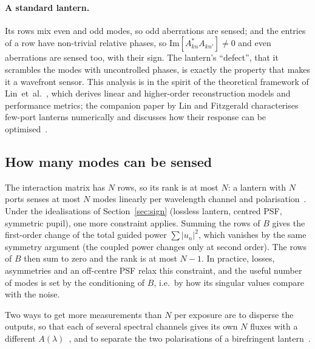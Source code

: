 \documentclass[11pt,a4paper]{article}
\begin{document}
\paragraph{A standard lantern.} Its rows mix even and odd modes, so odd aberrations are sensed; and the entries of a row have non-trivial relative phases, so $\mathrm{Im}[A_{kn}^* A_{kn'}] \neq 0$ and even aberrations are sensed too, with their sign. The lantern's ``defect'', that it scrambles the modes with uncontrolled phases, is exactly the property that makes it a wavefront sensor. This analysis is in the spirit of the theoretical framework of Lin~et~al.~\cite{Lin2022}, which derives linear and higher-order reconstruction models and performance metrics; the companion paper by Lin and Fitzgerald characterises few-port lanterns numerically and discusses how their response can be optimised~\cite{Lin2023}.

\subsection{How many modes can be sensed}
The interaction matrix has $N$ rows, so its rank is at most $N$: a lantern with $N$ ports senses at most $N$ modes linearly per wavelength channel and polarisation~\cite{Lin2023PRL}. Under the idealisations of Section~\ref{sec:sign} (lossless lantern, centred PSF, symmetric pupil), one more constraint applies. Summing the rows of $B$ gives the first-order change of the total guided power $\sum |u_n|^2$, which vanishes by the same symmetry argument (the coupled power changes only at second order). The rows of $B$ then sum to zero and the rank is at most $N-1$. In practice, losses, asymmetries and an off-centre PSF relax this constraint, and the useful number of modes is set by the conditioning of $B$, i.e.\ by how its singular values compare with the noise.

Two ways to get more measurements than $N$ per exposure are to disperse the outputs, so that each of several spectral channels gives its own $N$ fluxes with a different $A(\lambda)$~\cite{Lin2025}, and to separate the two polarisations of a birefringent lantern~\cite{Lin2023PRL}.
\end{document}
